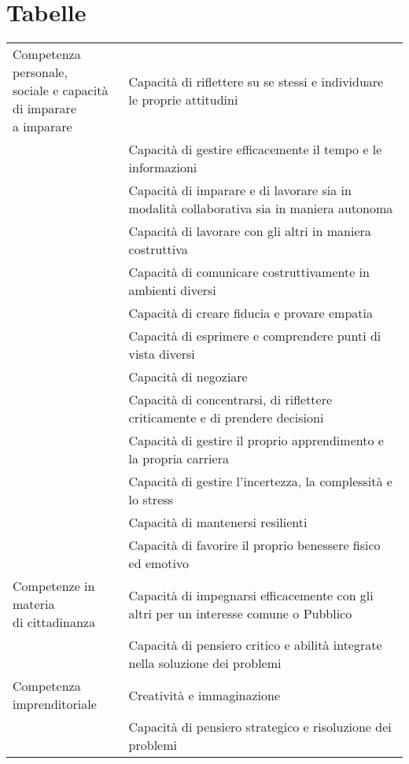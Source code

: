 \chapter{Tabelle}
\begin{tabular}{m{4cm}p{12.0cm}}
\toprule
\multirowcell{14}{Competenza personale,\\sociale e capacità\\ di imparare\\ a imparare}& Capacità di riflettere su se stessi e individuare le proprie attitudini\\
	&Capacità di gestire efficacemente il tempo e le informazioni  \\
	& Capacità di imparare e di lavorare sia in modalità collaborativa sia in maniera
	autonoma\\
	&  Capacità di lavorare con gli altri in maniera costruttiva\\
	&  Capacità di comunicare costruttivamente in ambienti diversi\\
	&  Capacità di creare fiducia e provare empatia\\
	&  Capacità di esprimere e comprendere punti di vista diversi\\
	&  Capacità di negoziare\\
	&  Capacità di concentrarsi, di riflettere criticamente e di prendere decisioni\\
	&  Capacità di gestire il proprio apprendimento e la propria carriera\\
	&  Capacità di gestire l'incertezza, la complessità e lo stress\\
	&  Capacità di mantenersi resilienti\\
	&  Capacità di favorire il proprio benessere fisico ed emotivo\\
\midrule
\multirowcell{1}{Competenze in materia\\di cittadinanza
}	& Capacità di impegnarsi efficacemente con gli altri per un interesse comune o
Pubblico \\
	& Capacità di pensiero critico e abilità integrate nella soluzione dei problemi \\
\midrule
	\multirowcell{12}{Competenza\\imprenditoriale}& Creatività e immaginazione\\
&Capacità di pensiero strategico e risoluzione dei problemi\\

\end{tabular}
